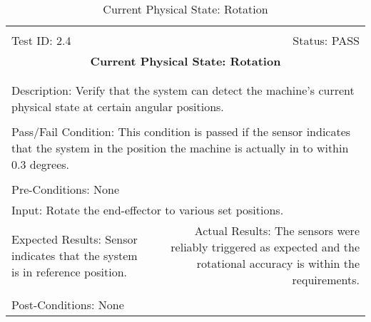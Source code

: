 \documentclass[titlepage]{article}
\begin{document}
\begin{center}
\begin{table}[h!]
\begin{tabular}{|l r|}\hline&\\[-2mm]
	Test ID: 2.4	&Status: PASS\\[-3mm]
	\multicolumn{2}{|c|}{\textbf{\large{Current Physical State: Rotation}}}\\&\\\hline&\\[-3mm]
	\multicolumn{2}{|p{\textwidth}|}{Description: Verify that the system can detect the machine's current physical state at certain angular positions.}\\[1mm]\hline&\\[-3mm]
	\multicolumn{2}{|p{\textwidth}|}{Pass/Fail Condition: This condition is passed if the sensor indicates that the system in the position the machine is actually in to within 0.3 degrees.}\\[1mm]\hline&\\[-3mm]
	\multicolumn{2}{|p{\textwidth}|}{Pre-Conditions: None}\\[4mm]
	\multicolumn{2}{|p{\textwidth}|}{Input: Rotate the end-effector to various set positions.}\\[2mm]\hline
	\multicolumn{1}{|p{0.49\textwidth}}{Expected Results: Sensor indicates that the system is in reference position.}	&\multicolumn{1}{|p{0.45\textwidth}|}{Actual Results: The sensors were reliably triggered as expected and the rotational accuracy is within the requirements.}\\\hline&\\[-3mm]
	\multicolumn{2}{|p{\textwidth}|}{Post-Conditions: None}\\\hline
\end{tabular}
\caption{Current Physical State: Rotation}
\end{table}
\end{center}
\end{document}

